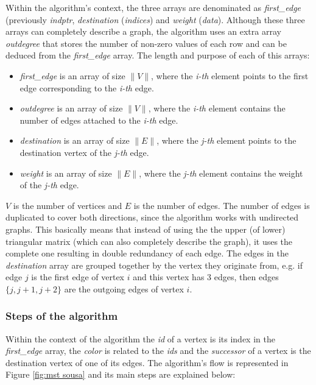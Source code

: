 Within the algorithm's context, the three arrays are denominated as \emph{first\_edge} (previously \emph{indptr}, \emph{destination} (\emph{indices}) and \emph{weight} (\emph{data}). Although these three arrays can completely describe a graph, the algorithm uses an extra array \emph{outdegree} that stores the number of non-zero values of each row and can be deduced from the \emph{first\_edge} array.
The length and purpose of each of this arrays:
\begin{itemize}
	\item \emph{first\_edge} is an array of size $\|V\|$, where the \emph{i-th} element points to the first edge corresponding to the \emph{i-th} edge.
	\item \emph{outdegree} is an array of size $\|V\|$, where the \emph{i-th} element contains the number of edges attached to the \emph{i-th} edge.
	\item \emph{destination} is an array of size $\|E\|$, where the \emph{j-th} element points to the destination vertex of the \emph{j-th} edge.
	\item \emph{weight} is an array of size $\|E\|$, where the \emph{j-th} element contains the weight of the \emph{j-th} edge.
\end{itemize}

$V$ is the number of vertices and $E$ is the number of edges.
The number of edges is duplicated to cover both directions, since the algorithm works with undirected graphs.
This basically means that instead of using the the upper (of lower) triangular matrix (which can also completely describe the graph), it uses the complete one resulting in double redundancy of each edge.
The edges in the \emph{destination} array are grouped together by the vertex they originate from, e.g. if edge $j$ is the first edge of vertex $i$ and this vertex has 3 edges, then edges $\{j,j+1,j+2\}$ are the outgoing edges of vertex $i$.

\subsubsection{Steps of the algorithm}

Within the context of the algorithm the \emph{id} of a vertex is its index in the \emph{first\_edge} array, the \emph{color} is related to the \emph{ids} and the \emph{successor} of a vertex is the destination vertex of one of its edges. The algorithm's flow is represented in Figure \ref{fig:mst sousa} and its main steps are explained below:

